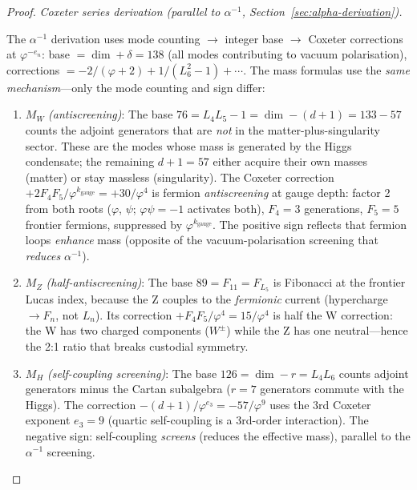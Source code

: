 \documentclass[12pt,a4paper]{article}
\begin{document}
\begin{proof}
\emph{Coxeter series derivation (parallel to $\alpha^{-1}$, Section~\ref{sec:alpha-derivation}).}

The $\alpha^{-1}$ derivation uses mode counting $\to$ integer base $\to$ Coxeter corrections at $\varphi^{-e_n}$: base $= \dim + \delta = 138$ (all modes contributing to vacuum polarisation), corrections $= -2/(\varphi{+}2) + 1/(L_6^2{-}1) + \cdots$.  The mass formulas use the \emph{same mechanism}---only the mode counting and sign differ:

\begin{enumerate}
\item $M_W$ \emph{(antiscreening)}: The base $76 = L_4 L_5 - 1 = \dim - (d{+}1) = 133 - 57$ counts the adjoint generators that are \emph{not} in the matter-plus-singularity sector.  These are the modes whose mass is generated by the Higgs condensate; the remaining $d{+}1 = 57$ either acquire their own masses (matter) or stay massless (singularity).  The Coxeter correction $+2F_4 F_5/\varphi^{k_{\mathrm{gauge}}} = +30/\varphi^4$ is fermion \emph{antiscreening} at gauge depth: factor 2 from both roots ($\varphi$, $\psi$; $\varphi\psi = -1$ activates both), $F_4 = 3$ generations, $F_5 = 5$ frontier fermions, suppressed by $\varphi^{k_{\mathrm{gauge}}}$.  The positive sign reflects that fermion loops \emph{enhance} mass (opposite of the vacuum-polarisation screening that \emph{reduces} $\alpha^{-1}$).

\item $M_Z$ \emph{(half-antiscreening)}: The base $89 = F_{11} = F_{L_5}$ is Fibonacci at the frontier Lucas index, because the Z couples to the \emph{fermionic} current (hypercharge $\to F_n$, not $L_n$).  Its correction $+F_4 F_5/\varphi^4 = 15/\varphi^4$ is half the W correction: the W has two charged components ($W^\pm$) while the Z has one neutral---hence the 2:1 ratio that breaks custodial symmetry.

\item $M_H$ \emph{(self-coupling screening)}: The base $126 = \dim - r = L_4 L_6$ counts adjoint generators minus the Cartan subalgebra ($r = 7$ generators commute with the Higgs).  The correction $-(d{+}1)/\varphi^{e_3} = -57/\varphi^9$ uses the 3rd Coxeter exponent $e_3 = 9$ (quartic self-coupling is a 3rd-order interaction).  The negative sign: self-coupling \emph{screens} (reduces the effective mass), parallel to the $\alpha^{-1}$ screening.
\end{enumerate}


\end{proof}
\end{document}

